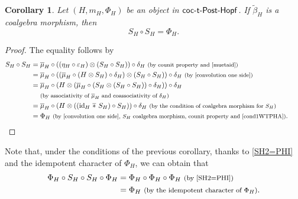 \documentclass[10pt,a4paper]{amsart}
\numberwithin{equation}{section}
\newtheorem{Corollary}[Theorem]{Corollary}
\DeclareMathOperator{\barast}{\,\overline{\ast}\,}
\begin{document}
\begin{Corollary}
Let $(H,m_{H},\Phi_{H})$ be an object in $\sf{coc}\textnormal{-}\sf{t}\textnormal{-}\sf{Post}\textnormal{-}\sf{Hopf}$. If $\tilde{\beta}_{H}$ is a coalgebra morphism, then
\begin{equation}\label{SH2=PHI}
S_{H}\circ S_{H}=\Phi_{H}.
\end{equation}
\end{Corollary}
\begin{proof} The equality follows by
\begin{align*}
S_{H}\circ S_{H}
={}&\overline{\mu}_{H}\circ((\eta_{H}\circ\varepsilon_{H})\otimes(S_{H}\circ S_{H}))\circ\delta_{H}\ \text{\footnotesize\textnormal{(by counit property and \eqref{muetaid})}}\\
={}&\overline{\mu}_{H}\circ((\overline{\mu}_{H}\circ(H\otimes S_{H})\circ\delta_{H})\otimes(S_{H}\circ S_{H}))\circ\delta_{H}\ \text{\footnotesize\textnormal{(by \eqref{convolution one side})}}\\
={}&\overline{\mu}_{H}\circ(H\otimes(\overline{\mu}_{H}\circ(S_{H}\otimes(S_{H}\circ S_{H}))\circ\delta_{H}))\circ\delta_{H}\\
&{}\text{\footnotesize\textnormal{(by associativity of $\overline{\mu}_{H}$ and coassociativity of $\delta_{H}$)}}\\
={}&\overline{\mu}_{H}\circ(H\otimes(({\rm id}_{H}\barast S_{H})\circ S_{H}))\circ\delta_{H}\ \text{\footnotesize\textnormal{(by the condition of coalgebra morphism for $S_{H}$)}}\\
={}&\Phi_{H}\ \text{\footnotesize\textnormal{(by \eqref{convolution one side}, $S_{H}$ coalgebra morphism, counit property and $\eqref{cond1WTPHA}$)}}.\tag*{\qed}
\end{align*}
\renewcommand{\qed}{}
\end{proof}

Note that, under the conditions of the previous corollary, thanks to \eqref{SH2=PHI} and the idempotent character of $\Phi_{H}$, we can obtain that
\begin{align}
\Phi_{H}\circ S_{H}\circ S_{H}\circ \Phi_{H}={}&\Phi_{H}\circ\Phi_{H}\circ\Phi_{H}\ \text{\footnotesize\textnormal{(by \eqref{SH2=PHI})}}\nonumber\\
={}&\Phi_{H}\ \text{\footnotesize\textnormal{(by the idempotent character of $\Phi_{H}$)}}.\label{impliSH2=PHI}
\end{align}
\end{document}
